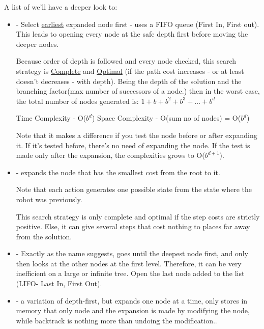 A list of  we'll have a deeper look to:
\begin{itemize}
    \item {} - Select \ul{earliest} expanded node first - uses a FIFO queue (First In, First out). This leads to opening every node at the safe depth first before moving the deeper nodes. 
    

    Because order of depth is followed and every node checked, this search strategy is \ul{Complete} and \ul{Optimal} (if the path cost increases - or at least doesn't decreases - with depth).
    Being  the depth of the solution and  the branching factor(max number of successors of a node.) then in the worst case, the total number of nodes generated is: $1 + b + b^2 + b^3 + \dots + b^d$

    Time Complexity - O($b^d$)
    Space Complexity - O(sum no of nodes) = O($b^d$)


    Note that it makes a difference if you test the node before or after expanding it. If it's tested before, there's no need of expanding the node. If the test is made only after the expansion, the complexities grows to O($b^{d+1}$). 


    \item {} - expands the node that has the smallest cost from the root to it. 


    Note that each action generates one possible state from the state where the robot was previously.

    This search strategy is only complete and optimal if the step costs are strictly positive. Else, it can give several steps that cost nothing to places far away from the solution.

    \item {} - Exactly as the name suggests, goes until the deepest node first, and only then looks at the other nodes at the first level. Therefore, it can be very inefficient on a large or infinite tree. Open the last node added to the list (LIFO- Last In, First Out).



    
    \item {} - a variation of depth-first, but expands one node at a time, only stores in memory that only node and the expansion is made by modifying the node, while backtrack is nothing more than undoing the modification..
    

\end{itemize}
